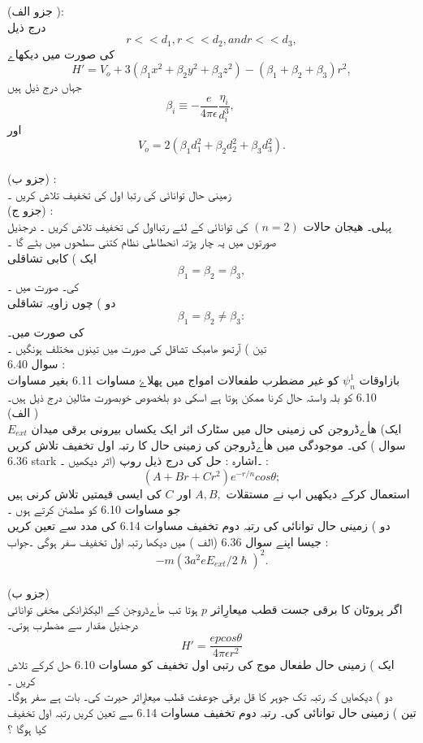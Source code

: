 (جزو الف ):\\
 درج ذیل 
\[r<<d_{1},r<<d_{2},andr<<d_{3},\]
کی صورت میں دیکھاے
\[H'=V_{o}+3(\beta_{1}x^{2}+\beta_{2}y^{2}+\beta_{3}z^{2})-(\beta_{1}+\beta_{2}+\beta_{3})r^{2},\]
جہاں  درج ذیل ہیں
\[\beta_{i}\equiv-\frac{e}{4\pi\epsilon}\frac{\eta_{i}}{d_{i}^{3}},\quad\quad\]
اور 
\[V_{o}=2(\beta_{1}d_{1}^{2}+\beta_{2}d_{2}^{2}+\beta_{3}d_{3}^{2}).\]\\
(جزو ب) : \\زمینی حال توانائی کی رتبا اول کی تخفیف تلاش کریں ۔\\
(جزو ج) :\\ پہلی۔ هیجان حالات 
\((n=2)\)
کی توانائی کے لئے رتبااول کی تخفیف تلاش کریں ۔ درجذیل صورتوں میں یہ چار پڑتہ انحطاطی نظام کتنی سطحوں میں بٹے گا ۔\\
ایک ) کابی تشاقلی
\[\beta_{1}=\beta_{2}=\beta_{3},\]
کی۔ صورت میں ۔\\
دو ) چوں زاویہ تشاقلی
\[\beta_{1}=\beta_{2}\neq\beta_{3}:\]
کی صورت میں۔\\
تین ) آرتھو ھامبک تشاقل کی صورت میں تینوں مختلف ہونگیں ۔\\
سوال 6.40 : \\بازاوقات 
\(\psi_{n}^{1}\)
کو غیر مضطرب طفعالات امواج میں پهلاۓ  مساوات 6.11 بغیر مساوات 6.10 کو بلہ واستہ حال کرنا ممکن ہوتا ہے اسکی دو بلخصوص خوبصورت مثالین درج ذیل ہیں۔\\
(الف )\\
ایک) ھاٰےڈروجن کی زمینی حال میں سٹارک اثر ایک یکساں بیرونی برقی میدان 
\(E_{ext}\)
کی۔ موجودگی میں ھاٰےڈروجن  کی زمینی حال کا رتبہ اول تخفیف تلاش کریں ( سوال 6.36 stark اثر دیکھیں ۔) ۔اشارہ : حل کی درج ذیل روپ :\\
\[(A+Br+Cr^{2})e^{-r/n}cos\theta;\]
استعمال کرکے دیکھیں اپ نے مستقلات 
\(A,B,\)
اور 
\(C\)
کی ایسی قیمتیں تلاش کرنی ہیں جو مساوات 6.10 کو مطمئن کرتے ہوں ۔\\
دو ) زمینی حال توانائی کی رتبہ دوم تخفیف مساوات 6.14 کی مدد سے  تعین کریں جیسا اپنے سوال 6.36 (الف ) میں دیکھا رتبہ اول تخفیف سفر ہوگی ۔جواب :\\
\[-m(3a^{2}eE_{ext}/2\hslash)^{2}.\]\\
(جزو ب)\\ اگر پروٹان کا برقی جست قطب میعارِاثر 
\(p\)
ہوتا تب  ھاٰےڈروجن کے  الیکٹرانکی مخفی توانائی درجذیل مقدار سے مضطرب ہوتی۔
\[H'=\frac{epcos\theta}{4\pi\epsilon r^{2}}\]
ایک ) زمینی حال طفعال موج کی رتبی اول تخفیف کو مساوات 6.10 حل کرکے تلاش کریں ۔\\
دو ) دیکھایں کہ رتبہ تک جوہر کا قل برقی جوعفت قطب میعارِاثر حیرت کی۔ بات ہے سفر ہوگا۔ \\
تین ) زمینی حال توانائی کی۔ رتبہ دوم تخفیف مساوات 6.14 سے تعین کریں رتبہ اول تخفیف کیا ہوگا ؟\\
\\

